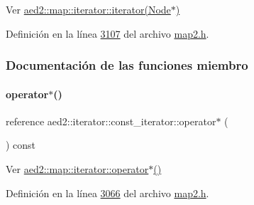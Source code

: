 Ver \hyperlink{classaed2_1_1map_1_1iterator_ab0ea21abcb32b6d5a72cf341b9029838_ab0ea21abcb32b6d5a72cf341b9029838}{aed2\+::map\+::iterator\+::iterator(\+Node$\ast$)} 



Definición en la línea \hyperlink{map2_8h_source_l03107}{3107} del archivo \hyperlink{map2_8h_source}{map2.\+h}.



\subsubsection{Documentación de las funciones miembro}
\mbox{\label{classaed2_1_1iterator_1_1const__iterator_a43ef67b26f144793d7bec567261738a1_a43ef67b26f144793d7bec567261738a1}} 
\paragraph{\texorpdfstring{operator$\ast$()}{operator*()}}
{\footnotesize\ttfamily reference aed2\+::iterator\+::const\+\_\+iterator\+::operator$\ast$ (\begin{DoxyParamCaption}{ }\end{DoxyParamCaption}) const\hspace{0.3cm}{\ttfamily [inline]}}



Ver \hyperlink{classaed2_1_1map_1_1iterator_ab115711d0295146906830840590d900a_ab115711d0295146906830840590d900a}{aed2\+::map\+::iterator\+::operator$\ast$()} 



Definición en la línea \hyperlink{map2_8h_source_l03066}{3066} del archivo \hyperlink{map2_8h_source}{map2.\+h}.

\mbox{\label{classaed2_1_1iterator_1_1const__iterator_afe8d4dc9ecced7c7f42db1b55f008b77_afe8d4dc9ecced7c7f42db1b55f008b77}} 
